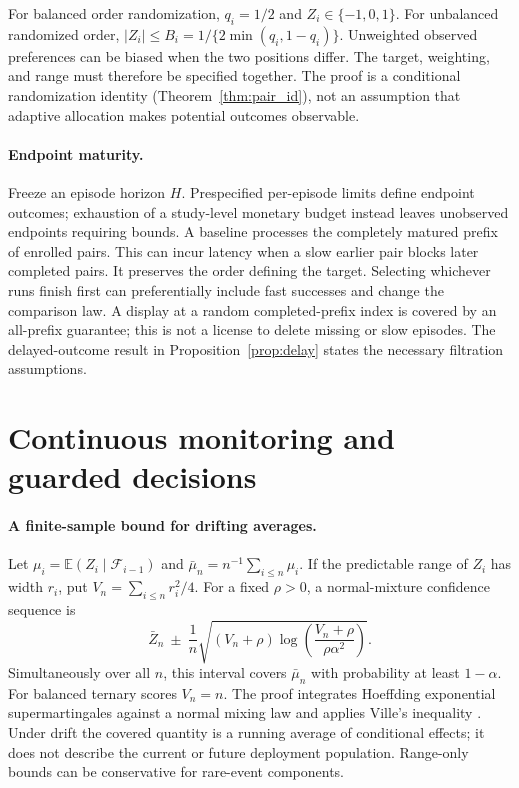 \documentclass{article}
\newcommand{\E}{\mathbb E}
\begin{document}
For balanced order randomization, $q_i=1/2$ and $Z_i\in\{-1,0,1\}$.
For unbalanced randomized order, $|Z_i|\leq
B_i=1/\{2\min(q_i,1-q_i)\}$. Unweighted observed preferences can be
biased when the two positions differ. The target, weighting, and range
must therefore be specified together. The proof is a conditional
randomization identity (Theorem~\ref{thm:pair_id}), not an assumption that
adaptive allocation makes potential outcomes observable.

\paragraph{Endpoint maturity.}
Freeze an episode horizon $H$. Prespecified per-episode limits define
endpoint outcomes; exhaustion of a study-level monetary budget instead
leaves unobserved endpoints requiring bounds. A baseline processes the completely matured prefix of enrolled pairs.
This can incur latency when a slow earlier pair blocks later completed
pairs. It preserves the order defining the target. Selecting whichever
runs finish first can preferentially include fast successes and change
the comparison law. A display at a random completed-prefix index is
covered by an all-prefix guarantee; this is not a license to delete
missing or slow episodes. The delayed-outcome result in
Proposition~\ref{prop:delay} states the necessary filtration assumptions.

\section{Continuous monitoring and guarded decisions}
\label{sec:monitoring}
\paragraph{A finite-sample bound for drifting averages.}
Let $\mu_i=\E(Z_i\mid\mathcal F_{i-1})$ and
$\bar\mu_n=n^{-1}\sum_{i\leq n}\mu_i$. If the predictable range of $Z_i$
has width $r_i$, put $V_n=\sum_{i\leq n}r_i^2/4$. For a fixed
$\rho>0$, a normal-mixture confidence sequence is
\begin{equation}
 \bar Z_n\ \pm\ \frac{1}{n}
 \sqrt{(V_n+\rho)\log\!\left(\frac{V_n+\rho}{\rho\alpha^2}\right)}.
 \label{eq:main_cs}
\end{equation}
Simultaneously over all $n$, this interval covers $\bar\mu_n$ with
probability at least $1-\alpha$. For balanced ternary scores $V_n=n$.
The proof integrates Hoeffding exponential supermartingales against a
normal mixing law and applies Ville's inequality
\citep{howard2021confidence}. Under drift the covered quantity is a
running average of conditional effects; it does not describe the current
or future deployment population. Range-only bounds can be conservative
for rare-event components.
\end{document}
